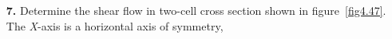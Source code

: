 \documentclass{AeroStructure-ERJohnson}
\begin{document}
\begin{exercise}
\begin{enumerate}[\textbf{2.}]
\clearpage

\item[\textbf{7.}]  Determine the shear flow in two-cell cross section shown in figure~\ref{fig4.47}. The \textit{X}-axis is a horizontal axis of symmetry,

{\def\thefigure{4.47}
}
\end{enumerate}
\end{exercise}

\clearemptydoublepage
\end{document}
